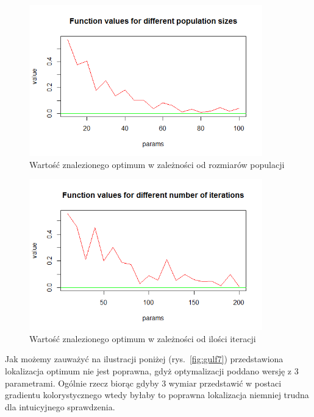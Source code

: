 \documentclass[11pt, a4paper]{article}
\newcommand{\fbi}{\leavevmode{\parindent=1em\indent}}
\begin{document}
\begin{figure}[H]
	\begin{center}
		\includegraphics[width=0.9\textwidth]{./assets/gulf5.png} %
		\caption{Wartość znalezionego optimum w zależności od rozmiarów populacji}
		\label{fig:gulf5}
	\end{center}
\end{figure}

\begin{figure}[H]
	\begin{center}
		\includegraphics[width=0.9\textwidth]{./assets/gulf6.png} %
		\caption{Wartość znalezionego optimum w zależności od ilości iteracji}
		\label{fig:gulf6}
	\end{center}
\end{figure}

\fbi
Jak możemy zauważyć na ilustracji poniżej (rys.~\ref{fig:gulf7}) przedstawiona lokalizacja optimum nie jest poprawna, gdyż optymalizacji poddano wersję z 3 parametrami. Ogólnie rzecz biorąc gdyby 3 wymiar przedstawić w postaci gradientu kolorystycznego wtedy byłaby to poprawna lokalizacja niemniej trudna dla intuicyjnego sprawdzenia.
\end{document}
